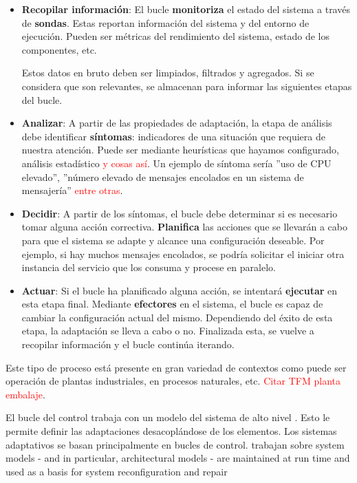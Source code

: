 \begin{itemize}
  \item \textbf{Recopilar información}: El bucle \textbf{monitoriza} el estado del sistema a través de \textbf{sondas}. Estas reportan información del sistema y del entorno de ejecución. Pueden ser métricas del rendimiento del sistema, estado de los componentes, etc.

  Estos datos en bruto deben ser limpiados, filtrados y agregados. Si se considera que son relevantes, se almacenan para informar las siguientes etapas del bucle.

  \item \textbf{Analizar}: A partir de las propiedades de adaptación, la etapa de análisis debe identificar \textbf{síntomas}: indicadores de una situación que requiera de nuestra atención. Puede ser mediante heurísticas que hayamos configurado, análisis estadístico \textcolor{red}{y cosas así}. Un ejemplo de síntoma sería ''uso de CPU elevado'', ''número elevado de mensajes encolados en un sistema de mensajería'' \textcolor{red}{entre otras}.

  \item \textbf{Decidir}: A partir de los síntomas, el bucle debe determinar si es necesario tomar alguna acción correctiva. \textbf{Planifica} las acciones que se llevarán a cabo para que el sistema se adapte y alcance una configuración deseable. Por ejemplo, si hay muchos mensajes encolados, se podría solicitar el iniciar otra instancia del servicio que los consuma y procese en paralelo.

  \item \textbf{Actuar}: Si el bucle ha planificado alguna acción, se intentará \textbf{ejecutar} en esta etapa final. Mediante \textbf{efectores} en el sistema, el bucle es capaz de cambiar la configuración actual del mismo. Dependiendo del éxito de esta etapa, la adaptación se lleva a cabo o no. Finalizada esta, se vuelve a recopilar información y el bucle continúa iterando.
\end{itemize}

Este tipo de proceso está presente en gran variedad de contextos como puede ser operación de plantas industriales, en procesos naturales, etc. \textcolor{red}{Citar TFM planta embalaje}.

El bucle del control trabaja con un modelo del sistema de alto nivel \cite{garlanIncreasingSystemDependability2003}. Esto le permite definir las adaptaciones desacoplándose de los elementos. Los sistemas adaptativos se basan principalmente en bucles de control. trabajan sobre system models - and in particular, architectural models - are maintained at run time
and used as a basis for system reconfiguration and repair \cite{garlanIncreasingSystemDependability2003}

